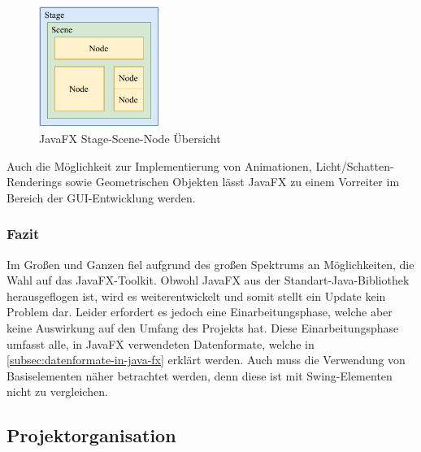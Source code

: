 \begin{figure}[H]
    \centering
    \includegraphics[width=0.35\textwidth]{fig/ainf/JavaFXStageSceneNode.pdf}
    \caption{JavaFX Stage-Scene-Node Übersicht}
    \label{fig:Stage-Scene-Node}
\end{figure}
Auch die Möglichkeit zur Implementierung von Animationen, Licht/Schatten-Renderings sowie Geometrischen Objekten lässt JavaFX zu einem Vorreiter im Bereich der GUI-Entwicklung werden.
\subsubsection{Fazit}
Im Großen und Ganzen fiel aufgrund des großen Spektrums an Möglichkeiten, die Wahl auf das JavaFX-Toolkit.
Obwohl JavaFX aus der Standart-Java-Bibliothek herausgeflogen ist, wird es weiterentwickelt und somit stellt ein Update kein Problem dar.
Leider erfordert es jedoch eine Einarbeitungsphase, welche aber keine Auswirkung auf den Umfang des Projekts hat.
Diese Einarbeitungsphase umfasst alle, in JavaFX verwendeten Datenformate, welche in \autoref{subsec:datenformate-in-java-fx} erklärt werden.
Auch muss die Verwendung von Basiselementen näher betrachtet werden, denn diese ist mit Swing-Elementen nicht zu vergleichen.
\subsection{Projektorganisation}\label{subsec:projektorganisation}

